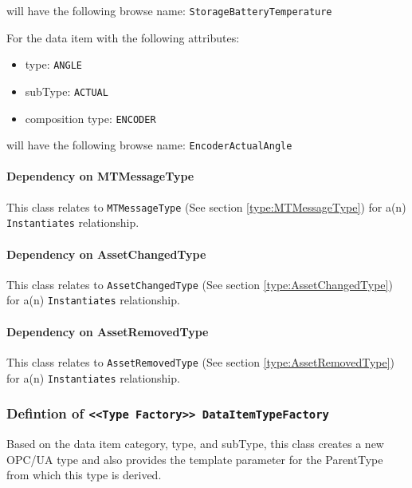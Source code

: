 \begin{itemize}
will have the following browse name: \texttt{StorageBatteryTemperature}

For the data item with the following attributes:

\begin{itemize}
\item type: \texttt{ANGLE}
\item subType: \texttt{ACTUAL}
\item composition type: \texttt{ENCODER}
\end{itemize}

will have the following browse name: \texttt{EncoderActualAngle}


\end{itemize}
\paragraph{Dependency on MTMessageType}

This class relates to \texttt{MTMessageType} (See section \ref{type:MTMessageType}) for a(n) \texttt{Instantiates} relationship.

\paragraph{Dependency on AssetChangedType}

This class relates to \texttt{AssetChangedType} (See section \ref{type:AssetChangedType}) for a(n) \texttt{Instantiates} relationship.

\paragraph{Dependency on AssetRemovedType}

This class relates to \texttt{AssetRemovedType} (See section \ref{type:AssetRemovedType}) for a(n) \texttt{Instantiates} relationship.

\FloatBarrier
\subsubsection{Defintion of \texttt{<<Type Factory>> DataItemTypeFactory}} \label{type:DataItemTypeFactory}

\FloatBarrier

Based on the data item category, type, and subType, this class creates a new OPC/UA type 
and also provides the template parameter for the ParentType from which this type is derived. 


